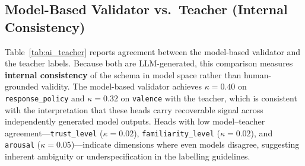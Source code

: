 \documentclass[11pt]{article}
\begin{document}
\begin{table}[tp]
\centering
\caption{Annotator quality-control summary. Min-time ratio = fraction of turns at the 50\,s floor timer. Empty notes = fraction of turns with no free-text note.}
\label{tab:audit_qc}
\scriptsize
{}
\end{table}

\subsection{Model-Based Validator vs.\ Teacher (Internal Consistency)}

Table~\ref{tab:ai_teacher} reports agreement between the model-based validator and the teacher labels.
Because both are LLM-generated, this comparison measures \textbf{internal consistency} of the schema in model space rather than human-grounded validity.
The model-based validator achieves $\kappa{=}0.40$ on \texttt{response\_policy} and $\kappa{=}0.32$ on \texttt{valence} with the teacher, which is consistent with the interpretation that these heads carry recoverable signal across independently generated model outputs.
Heads with low model--teacher agreement---\texttt{trust\_level} ($\kappa{=}0.02$), \texttt{familiarity\_level} ($\kappa{=}0.02$), and \texttt{arousal} ($\kappa{=}0.05$)---indicate dimensions where even models disagree, suggesting inherent ambiguity or underspecification in the labelling guidelines.
\end{document}
